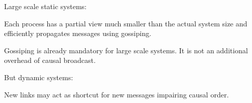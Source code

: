 \documentclass[10pt, xcolor={usenames, dvipsnames}]{beamer}
\newcommand{\cmark}{\ding{51}}
\newcommand{\xmark}{\ding{55}}
\newcommand{\YES}[1]{\textcolor{green}{#1}}
\newcommand{\NO}[1]{\textcolor{red}{#1}}
\begin{document}
\begin{frame}{Large scale static systems: \YES{\cmark}}

  Each process has a partial view much smaller than the actual system size and
  efficiently propagates messages using gossiping.

  \begin{center}
    
  \end{center}

  Gossiping is already mandatory for large scale systems. It is not an
  additional overhead of causal broadcast.

\end{frame}



\begin{frame}{But dynamic systems: \NO{\xmark}}

  New links may act as shortcut for new messages impairing causal order.

  \begin{minipage}{0.32\textwidth}
    \vspace{1pt}
    \begin{center}
      
    \end{center}
  \end{minipage}
  \begin{minipage}{0.32\textwidth}
    \vspace{1pt}
    \begin{center}
      
    \end{center}
  \end{minipage}
  \begin{minipage}{0.32\textwidth}
    \begin{center}
      
    \end{center}
  \end{minipage}
  

\end{frame}
\end{document}
